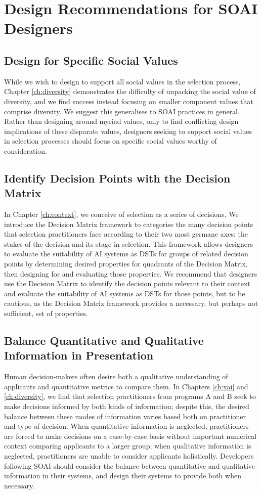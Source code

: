 \section{Design Recommendations for SOAI Designers}
\subsection{Design for Specific Social Values}
While we wish to design to support all social values in the selection process, Chapter \ref{ch:diversity} demonstrates the difficulty of unpacking the social value of diversity, and we find success instead focusing on smaller component values that comprise diversity. We suggest this generalises to SOAI practices in general. Rather than designing around myriad values, only to find conflicting design implications of these disparate values, designers seeking to support social values in selection processes should focus on specific social values worthy of consideration.

\subsection{Identify Decision Points with the Decision Matrix}
In Chapter \ref{ch:context}, we conceive of selection as a series of decisions. We introduce the Decision Matrix framework to categorise the many decision points that selection practitioners face according to their two most germane axes: the stakes of the decision and its stage in selection. This framework allows designers to evaluate the suitability of AI systems as DSTs for groups of related decision points by determining desired properties for quadrants of the Decision Matrix, then designing for and evaluating those properties. We recommend that designers use the Decision Matrix to identify the decision points relevant to their context and evaluate the suitability of AI systems as DSTs for those points, but to be cautious, as the Decision Matrix framework provides a necessary, but perhaps not sufficient, set of properties. 

\subsection{Balance Quantitative and Qualitative Information in Presentation}
Human decision-makers often desire both a qualitative understanding of applicants and quantitative metrics to compare them. In Chapters \ref{ch:xai} and \ref{ch:diversity}, we find that selection practitioners from programs A and B seek to make decisions informed by both kinds of information; despite this, the desired balance between these modes of information varies based both on practitioner and type of decision. When quantitative information is neglected, practitioners are forced to make decisions on a case-by-case basis without important numerical context comparing applicants to a larger group; when qualitative information is neglected, practitioners are unable to consider applicants holistically. Developers following SOAI should consider the balance between quantitative and qualitative information in their systems, and design their systems to provide both when necessary.


